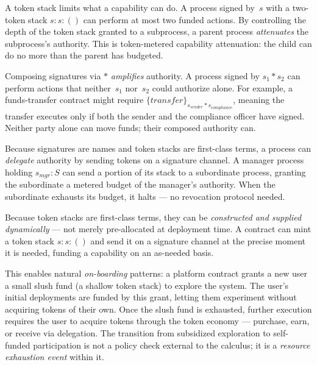 \documentclass[11pt,a4paper]{article}
\newcommand{\signed}[2]{\{#1\}_{#2}}
\newcommand{\comp}{\mathbin{*}}
\begin{document}
\begin{description}[style=nextline, leftmargin=2em, nosep]
  \item[Attenuation.]
    A token stack limits what a capability can do.  A process
    signed by~$s$ with a two-token stack $s : s : ()$ can
    perform at most two funded actions.  By controlling the
    depth of the token stack granted to a subprocess, a parent
    process \emph{attenuates} the subprocess's authority.
    This is token-metered capability attenuation: the child
    can do no more than the parent has budgeted.

  \item[Amplification.]
    Composing signatures via $\comp$ \emph{amplifies}
    authority.  A process signed by $s_1 \comp s_2$ can
    perform actions that neither~$s_1$ nor~$s_2$ could
    authorize alone.  For example, a funds-transfer contract
    might require $\signed{\mathit{transfer}}
    {s_{\mathit{sender}} \comp s_{\mathit{compliance}}}$,
    meaning the transfer executes only if both the sender and
    the compliance officer have signed.  Neither party alone
    can move funds; their composed authority can.

  \item[Programmable delegation.]
    Because signatures are names and token stacks are
    first-class terms, a process can \emph{delegate}
    authority by sending tokens on a signature channel.  A
    manager process holding $s_{\mathit{mgr}} : S$ can send a
    portion of its stack to a subordinate process, granting
    the subordinate a metered budget of the manager's
    authority.  When the subordinate exhausts its budget, it
    halts --- no revocation protocol needed.

  \item[Just-in-time funding.]
    Because token stacks are first-class terms, they can be
    \emph{constructed and supplied dynamically} --- not merely
    pre-allocated at deployment time.  A contract can mint a
    token stack $s : s : ()$ and send it on a signature
    channel at the precise moment it is needed, funding a
    capability on an as-needed basis.

    This enables natural \emph{on-boarding} patterns: a
    platform contract grants a new user a small slush fund
    (a shallow token stack) to explore the system.  The
    user's initial deployments are funded by this grant,
    letting them experiment without acquiring tokens of
    their own.  Once the slush fund is exhausted, further
    execution requires the user to acquire tokens through
    the token economy --- purchase, earn, or receive via
    delegation.  The transition from subsidized exploration
    to self-funded participation is not a policy check
    external to the calculus; it is a \emph{resource
    exhaustion event} within it.
\end{description}
\end{document}
